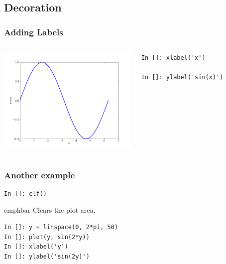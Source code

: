 \documentclass[14pt,compress]{beamer}
\newcommand{\emphbar}[1]
{\begin{beamercolorbox}[rounded=true]{emphbar} 
      {#1}
 \end{beamercolorbox}
}
\newcommand{\typ}[1]{\lstinline{#1}}
\begin{document}
\subsection{Decoration}
\begin{frame}[fragile]
\frametitle{Adding Labels}
\begin{columns}
  \hspace*{-0.45in}
  \includegraphics[height=2in, interpolate=true]{data/label}  
  \hspace*{0.5in}
  \begin{block}{}
  \small
  \begin{lstlisting}
In []: xlabel('x')

In []: ylabel('sin(x)')
  \end{lstlisting}
  \small

  \end{block}
\end{columns}
\end{frame}

\begin{frame}[fragile]
\frametitle{Another example}
  \begin{lstlisting}
In []: clf()
  \end{lstlisting}
\emphbar{Clears the plot area.}
  \begin{lstlisting}
In []: y = linspace(0, 2*pi, 50)
In []: plot(y, sin(2*y))
In []: xlabel('y')
In []: ylabel('sin(2y)')
  \end{lstlisting}
\end{frame}
\end{document}
